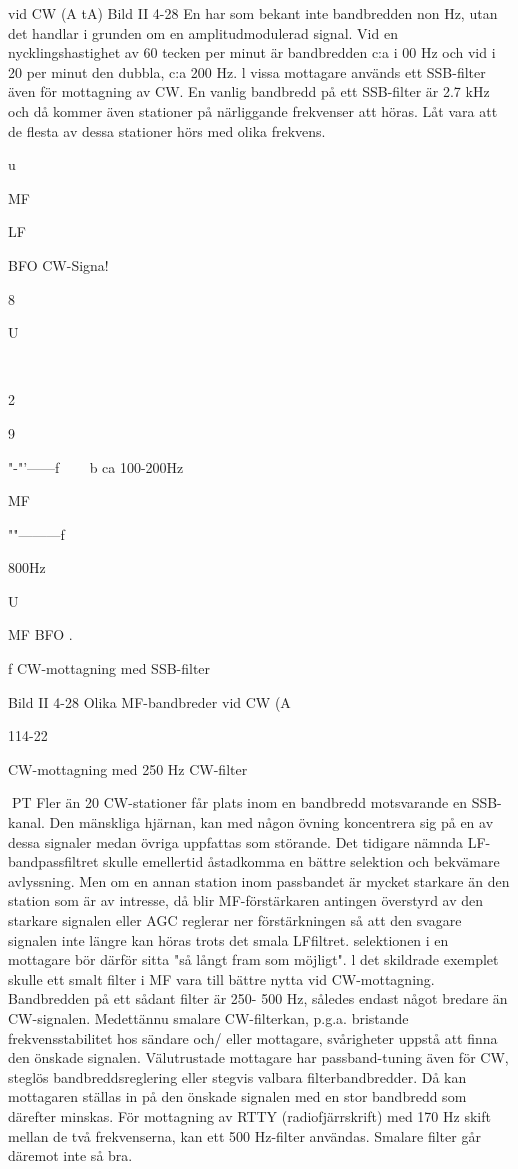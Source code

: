 vid CW (A tA)
Bild II 4-28
En
har som bekant inte bandbredden non Hz, utan det handlar i grunden
om en amplitudmodulerad signal. Vid en
nycklingshastighet av 60 tecken per minut
är bandbredden c:a i 00 Hz och vid i 20
per minut den dubbla, c:a 200 Hz.
l vissa mottagare används ett SSB-filter
även för mottagning av CW. En vanlig bandbredd på ett SSB-filter är 2.7 kHz och då
kommer även stationer på närliggande frekvenser att höras. Låt vara att de flesta av
dessa stationer hörs med olika frekvens.

u

MF

LF

BFO
CW-Signa!

8

U

~~~

2

9

"-"'------f
~~~ b ca 100-200Hz

MF

""---------f

800Hz

U

MF
BFO .

f
CW-mottagning med SSB-filter

Bild II 4-28 Olika MF-bandbreder vid CW (A

114-22

CW-mottagning med 250 Hz CW-filter

PT
Fler än 20 CW-stationer får plats inom en
bandbredd motsvarande en SSB-kanal. Den
mänskliga hjärnan, kan med någon övning
koncentrera sig på en av dessa signaler
medan övriga uppfattas som störande.
Det tidigare nämnda LF-bandpassfiltret
skulle emellertid åstadkomma en bättre selektion och bekvämare avlyssning. Men om
en annan station inom passbandet är mycket
starkare än den station som är av intresse,
då blir MF-förstärkaren antingen överstyrd
av den starkare signalen eller AGC reglerar
ner förstärkningen så att den svagare signalen inte längre kan höras trots det smala LFfiltret. selektionen i en mottagare bör därför
sitta "så långt fram som möjligt". l det skildrade exemplet skulle ett smalt filter i MF vara
till bättre nytta vid CW-mottagning. Bandbredden på ett sådant filter är 250- 500 Hz,
således endast något bredare än CW-signalen.
Medettännu smalare CW-filterkan, p.g.a.
bristande frekvensstabilitet hos sändare och/
eller mottagare, svårigheter uppstå att finna
den önskade signalen. Välutrustade mottagare har passband-tuning även för CW,
steglös bandbreddsreglering eller stegvis
valbara filterbandbredder. Då kan mottagaren ställas in på den önskade signalen med
en stor bandbredd som därefter minskas.
För mottagning av RTTY (radiofjärrskrift)
med 170 Hz skift mellan de två frekvenserna, kan ett 500 Hz-filter användas. Smalare filter går däremot inte så bra.

